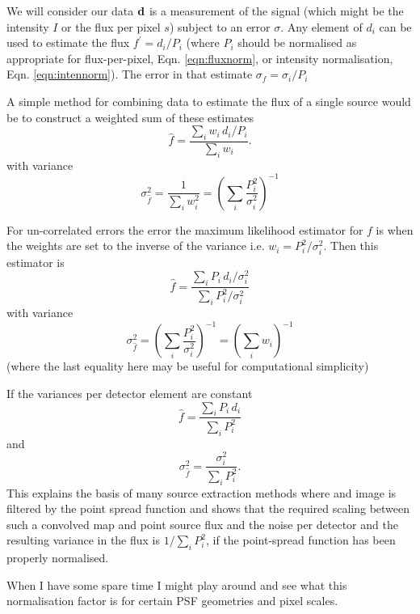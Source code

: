 \documentclass{article}
\begin{document}
We will consider our data ${\bf d}$ is a measurement of the signal (which might be the intensity $I$ or the flux per pixel $s$) subject to an error $\sigma$.  Any element of $d_i$ can be used to estimate the flux $f^\prime=d_i/P_i$ (where $P_i$ should be normalised as appropriate for flux-per-pixel, Eqn. \ref{eqn:fluxnorm}, or intensity normalisation, Eqn. \ref{eqn:intennorm}).  The error in that estimate $\sigma_f=\sigma_i/P_i$

A simple method for combining data to estimate the flux of a single source would be to construct a weighted sum of these estimates
\begin{equation}
\hat{f}=\frac{\sum_i w_i\, d_i/P_i}{\sum_i w_i}.
\end{equation}
with variance
\begin{equation}
\sigma^2_{\hat{f}}=\frac{1}{\sum_i w_i^2}=\left(\sum_i{\frac{P_i^2}{\sigma_i^2}}\right)^{-1}
\end{equation}


For un-correlated errors the error the maximum likelihood estimator for $f$ is when the weights are set to the inverse of the variance i.e. $w_i=P_i^2/\sigma_i^2$.  Then this estimator is
\begin{equation}
\hat{f}=\frac{\sum_i P_i\, d_i/\sigma_i^2}{\sum_i P_i^2/\sigma_i^2}
\end{equation}
with variance
\begin{equation}
\sigma^2_{\hat{f}}=\left(\sum_i{\frac{P_i^2}{\sigma_i^2}}\right)^{-1}=\left({\sum_i w_i}\right)^{-1}
\end{equation}
(where the last equality here may be useful for computational simplicity)

If the variances per detector element are constant
\begin{equation}
\hat{f}=\frac{\sum_i P_i\, d_i}{\sum_i P_i^2}
\end{equation}
and 
\begin{equation}
\sigma^2_{\hat{f}}=\frac{{\sigma_i^2}}{\sum_i P_i^2}.
\end{equation}
This explains the basis of many source extraction methods where and image is filtered by the point spread function and shows that the required scaling between such a convolved map and point source flux and the noise per detector and the resulting variance in the flux is ${{1}}/{\sum_i P_i^2}$, if the point-spread function has been properly normalised.

When I have some spare time I might play around and see what this normalisation factor is for certain PSF geometries and pixel scales.
\end{document}
